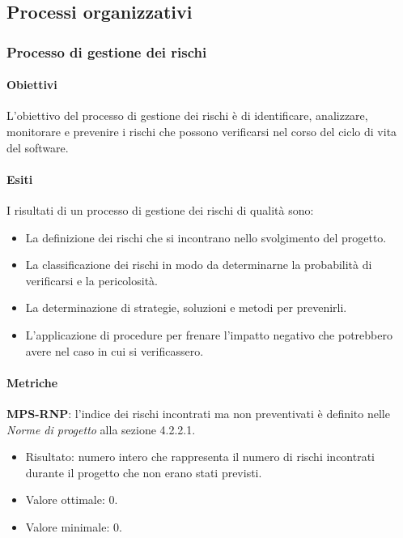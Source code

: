 \documentclass[../piano-di-qualifica.tex]{subfiles}
\begin{document}
\subsection{Processi organizzativi}%
\label{sub:processi_organizzativi}

\subsubsection{Processo di gestione dei rischi}%
\label{sub:processo_di_gestione_dei_rischi}

\paragraph{Obiettivi}%
\label{par:obiettivi_rischi}

L'obiettivo del processo di gestione dei rischi è di identificare, analizzare, monitorare e prevenire i rischi che possono verificarsi nel corso del ciclo di vita del software.

\paragraph{Esiti}%
\label{par:esiti_rischi}

I risultati di un processo di gestione dei rischi di qualità sono:
\begin{itemize}
  \item La definizione dei rischi che si incontrano nello svolgimento del progetto.
  \item La classificazione dei rischi in modo da determinarne la probabilità di verificarsi e la pericolosità.
  \item La determinazione di strategie, soluzioni e metodi per prevenirli.
  \item L'applicazione di procedure per frenare l'impatto negativo che potrebbero avere nel caso in cui si verificassero.
\end{itemize}

\paragraph{Metriche}%
\label{par:metriche_rischi}

\textbf{MPS-RNP}: l'indice dei rischi incontrati ma non preventivati è definito nelle \textit{Norme di progetto} alla sezione 4.2.2.1.
\begin{itemize}
  \item Risultato: numero intero che rappresenta il numero di rischi incontrati durante il progetto che non erano stati previsti.
  \item Valore ottimale: 0.
  \item Valore minimale: 0.
\end{itemize}
\end{document}
